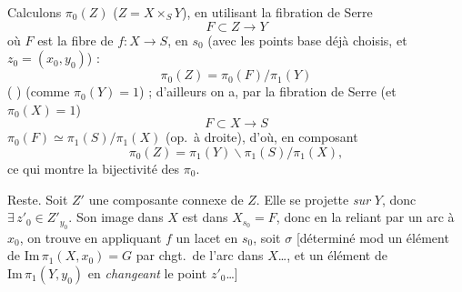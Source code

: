 \documentclass[11pt,a4paper]{article}
\begin{document}




Calculons $\pi_0(Z)$ ($Z = X \times_S Y$), en utilisant la fibration de Serre
\[
  F \subset Z \to Y
\]
où $F$ est la fibre de $f : X \to S$, en $s_0$ (avec les points base déjà
choisis, et $z_0 = (x_0, y_0)$) :
\[
  \pi_0(Z) = \pi_0(F) / \pi_1(Y)
\]
( \ill{})
(comme $\pi_0(Y) = 1$) ; d'ailleurs on a, par
la fibration de Serre (et $\pi_0(X) = 1$)
\[
  F \subset X \to S
\]
 $\pi_0(F) \simeq \pi_1(S) / \pi_1(X)$ (op.\ à droite), d'où, en composant
\[
  \pi_0(Z) = \pi_1(Y) \backslash \pi_1(S) / \pi_1(X) ,
\]
ce qui montre la bijectivité des $\pi_0$.

Reste. Soit $Z'$ une composante connexe de $Z$. Elle se projette \emph{sur}
$Y$, donc $\exists\, z'_0 \in Z'_{y_0}$. Son image dans $X$ est 
dans $X_{s_0} = F$, donc en la reliant par un arc à $x_0$, on trouve en
appliquant $f$ un lacet en $s_0$, soit $\sigma$ [déterminé mod un élément de
$\mathrm{Im}\, \pi_1(X, x_0) = G$ par chgt.\ de l'arc dans $X$…, et
 un élément de $\mathrm{Im}\, \pi_1(Y, y_0)$ en
\emph{changeant} le point $z'_0$…]


\end{document}

